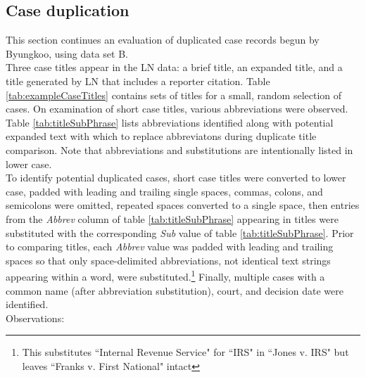 \documentclass[10pt, letterpaper]{article}
\begin{document}
\begin{spacing}{1.0}

\clearpage

\section{Case duplication}

This section continues an evaluation of duplicated case records begun by Byungkoo, using data set B.\\

Three case titles appear in the LN data:  a brief title, an expanded title, and a title generated by LN that includes a reporter citation.  Table \ref{tab:exampleCaseTitles} contains sets of titles for a small, random selection of cases.  On examination of short case titles, various abbreviations were observed.  Table \ref{tab:titleSubPhrase} lists abbreviations identified along with potential expanded text with which to replace abbreviatons during duplicate title comparison.  Note that abbreviations and substitutions are intentionally listed in lower case.\\

To identify potential duplicated cases, short case titles were converted to lower case, padded with leading and trailing single spaces, commas, colons, and semicolons were omitted, repeated spaces converted to a single space, then entries from the \textit{Abbrev} column of table \ref{tab:titleSubPhrase} appearing in titles were substituted with the corresponding \textit{Sub} value of table \ref{tab:titleSubPhrase}.  Prior to comparing titles, each \textit{Abbrev} value was padded with leading and trailing spaces so that only space-delimited abbreviations, not identical text strings appearing within a word, were substituted.\footnote{This substitutes ``Internal Revenue Service" for ``IRS" in ``Jones v. IRS" but leaves ``Franks v. First National" intact}  Finally, multiple cases with a common name (after abbreviation substitution), court, and decision date were identified.\\

Observations:


\end{spacing}
\end{document}
